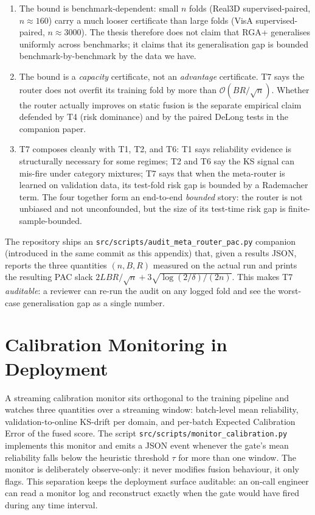 \documentclass[11pt]{article}
\begin{document}
\begin{enumerate}
  \item The bound is benchmark-dependent: small $n$ folds (Real3D
        supervised-paired, $n\!\approx\!160$) carry a much looser
        certificate than large folds (VisA supervised-paired,
        $n\!\approx\!3000$). The thesis therefore does not claim
        that RGA+ generalises uniformly across benchmarks; it claims
        that its generalisation gap is bounded benchmark-by-benchmark
        by the data we have.
  \item The bound is a \emph{capacity} certificate, not an
        \emph{advantage} certificate. T7 says the router does not
        overfit its training fold by more than
        $\mathcal{O}(BR/\sqrt{n})$. Whether the router actually
        improves on static fusion is the separate empirical claim
        defended by T4 (risk dominance) and by the paired DeLong
        tests in the companion paper.
  \item T7 composes cleanly with T1, T2, and T6: T1 says
        reliability evidence is structurally necessary for some
        regimes; T2 and T6 say the KS signal can mis-fire under
        category mixtures; T7 says that when the meta-router is
        learned on validation data, its test-fold risk gap is
        bounded by a Rademacher term. The four together form an
        end-to-end \emph{bounded} story: the router is not unbiased
        and not unconfounded, but the size of its test-time risk gap
        is finite-sample-bounded.
\end{enumerate}

The repository ships an \texttt{src/scripts/audit\_meta\_router\_pac.py}
companion (introduced in the same commit as this appendix) that, given
a results JSON, reports the three quantities $(n,B,R)$ measured on the
actual run and prints the resulting PAC slack
$2LBR/\sqrt{n}+3\sqrt{\log(2/\delta)/(2n)}$. This makes T7
\emph{auditable}: a reviewer can re-run the audit on any logged fold
and see the worst-case generalisation gap as a single number.

\section{Calibration Monitoring in Deployment}
\label{app:calibration-monitor}

A streaming calibration monitor sits orthogonal to the training
pipeline and watches three quantities over a streaming window:
batch-level mean reliability, validation-to-online KS-drift per domain,
and per-batch Expected Calibration Error of the fused score. The script
\texttt{src/scripts/monitor\_calibration.py} implements this monitor and
emits a JSON event whenever the gate's mean reliability falls below the
heuristic threshold $\tau$ for more than one window. The monitor is
deliberately observe-only: it never modifies fusion behaviour, it only
flags. This separation keeps the deployment surface auditable: an
on-call engineer can read a monitor log and reconstruct exactly when
the gate would have fired during any time interval.
\end{document}
